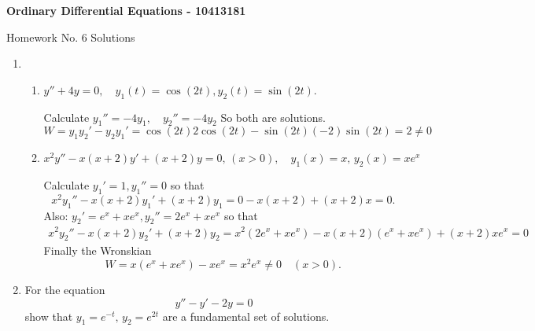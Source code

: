 \documentclass[10pt,a4paper]{letter}
\begin{document}
\begin{center}
\begin{Large}
\textbf{Ordinary Differential Equations - 10413181}\\
\end{Large}
\vspace{1em}
\begin{large}Homework No. 6 Solutions\end{large}
\end{center}

\begin{enumerate}
\item 
\begin{enumerate}
\item $ y'' + 4y = 0, \quad y_1(t) = \cos(2t), y_2(t) = \sin(2t).$

 Calculate $y_1'' = -4 y_1, \quad y_2'' = -4 y_2 $
So both are solutions.
\[ W = y_1 y_2' - y_2 y_1' = \cos(2t) 2 \cos(2t) - \sin(2t) (-2) \sin(2t) = 2 \neq 0 \]
\item $ x^2 y'' - x(x+2)y' + (x+2)y = 0, \, (x>0), \quad y_1(x) = x, \, y_2(x) = xe^{x}$

Calculate $y_1' = 1, y_1'' = 0$ so that 
\[ x^2 y_1'' - x(x+2)y_1' + (x+2)y_1 = 0 - x(x+2) + (x+2)x = 0. \]
Also: $y_2' = e^x + xe^x, y_2'' = 2e^x + xe^x$ so that
\begin{align*}
 x^2 y_2'' - x(x+2)y_2' + (x+2)y_2 = x^2(2e^x + xe^x) - x(x+2)(e^x + xe^x) + (x+2)xe^x = 0 
\end{align*}
Finally the Wronskian 
\[ W = x(e^x + xe^x) - xe^x = x^2 e^x \neq 0 \quad (x > 0). \]
\end{enumerate} 
\item For the equation
\[ y'' - y' - 2y = 0 \]
show that $y_1 = e^{-t}, \, y_2 = e^{2t}$ are a fundamental set of solutions.


\end{enumerate}
\end{document}
